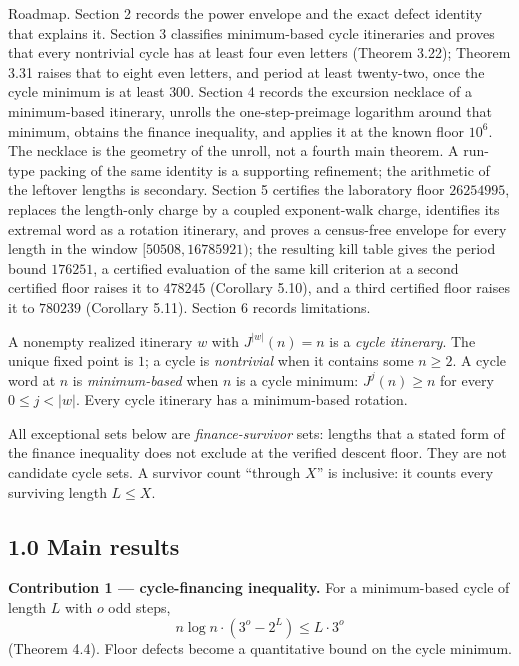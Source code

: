 \documentclass[12pt]{article}
\begin{document}
Roadmap. Section 2 records the power envelope and the exact defect
identity that explains it. Section 3 classifies minimum-based cycle
itineraries and proves that every nontrivial cycle has at least four
even letters (Theorem 3.22); Theorem 3.31 raises that to eight even
letters, and period at least twenty-two, once the cycle minimum is at
least \(300\). Section 4 records the excursion necklace of a
minimum-based itinerary, unrolls the one-step-preimage logarithm around
that minimum, obtains the finance inequality, and applies it at the
known floor \(10^6\). The necklace is the geometry of the unroll, not a
fourth main theorem. A run-type packing of the same identity is a
supporting refinement; the arithmetic of the leftover lengths is
secondary. Section 5 certifies the laboratory floor \(26254995\),
replaces the length-only charge by a coupled exponent-walk charge,
identifies its extremal word as a rotation itinerary, and proves a
census-free envelope for every length in the window
\([50508,16785921)\); the resulting kill table gives the period bound
\(176251\), a certified evaluation of the same kill criterion at a
second certified floor raises it to \(478245\) (Corollary 5.10), and a
third certified floor raises it to \(780239\) (Corollary 5.11). Section
6 records limitations.

A nonempty realized itinerary \(w\) with \(J^{|w|}(n)=n\) is a
\emph{cycle itinerary}. The unique fixed point is \(1\); a cycle is
\emph{nontrivial} when it contains some \(n\ge 2\). A cycle word at
\(n\) is \emph{minimum-based} when \(n\) is a cycle minimum:
\(J^j(n)\ge n\) for every \(0\le j<|w|\). Every cycle itinerary has a
minimum-based rotation.

All exceptional sets below are \emph{finance-survivor} sets: lengths
that a stated form of the finance inequality does not exclude at the
verified descent floor. They are not candidate cycle sets. A survivor
count ``through \(X\)'' is inclusive: it counts every surviving length
\(L\le X\).

\subsection{1.0 Main results}\label{main-results}

\textbf{Contribution 1 --- cycle-financing inequality.} For a
minimum-based cycle of length \(L\) with \(o\) odd steps, \[
n\log n\cdot(3^o-2^L)\le L\cdot 3^o
\] (Theorem 4.4). Floor defects become a quantitative bound on the cycle
minimum.
\end{document}
